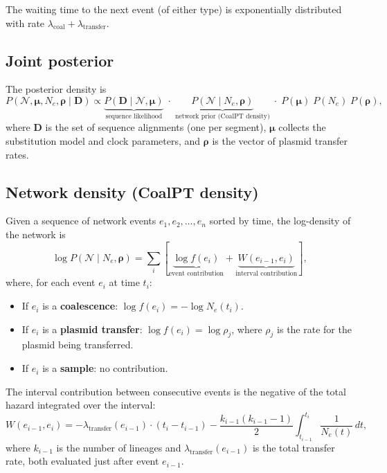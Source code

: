 \documentclass[11pt]{article}
\begin{document}
The waiting time to the next event (of either type) is exponentially distributed with rate $\lambda_{\text{coal}} + \lambda_{\text{transfer}}$.

\subsection{Joint posterior}

The posterior density is
\begin{equation}
  P(\mathcal{N}, \boldsymbol{\mu}, N_e, \boldsymbol{\rho} \mid \mathbf{D})
  \propto
  \underbrace{P(\mathbf{D} \mid \mathcal{N}, \boldsymbol{\mu})}_{\text{sequence likelihood}}
  \;\cdot\;
  \underbrace{P(\mathcal{N} \mid N_e, \boldsymbol{\rho})}_{\text{network prior (CoalPT density)}}
  \;\cdot\;
  P(\boldsymbol{\mu}) \; P(N_e) \; P(\boldsymbol{\rho}),
\end{equation}
where $\mathbf{D}$ is the set of sequence alignments (one per segment), $\boldsymbol{\mu}$ collects the substitution model and clock parameters, and $\boldsymbol{\rho}$ is the vector of plasmid transfer rates.

\subsection{Network density (CoalPT density)}

Given a sequence of network events $e_1, e_2, \ldots, e_n$ sorted by time, the log-density of the network is
\begin{equation}
  \log P(\mathcal{N} \mid N_e, \boldsymbol{\rho})
  = \sum_{i} \left[ \underbrace{\log f(e_i)}_{\text{event contribution}} + \underbrace{W(e_{i-1}, e_i)}_{\text{interval contribution}} \right],
\end{equation}
where, for each event $e_i$ at time $t_i$:

\begin{itemize}
  \item If $e_i$ is a \textbf{coalescence}:
    $\log f(e_i) = -\log N_e(t_i)$.

  \item If $e_i$ is a \textbf{plasmid transfer}:
    $\log f(e_i) = \log \rho_j$,
    where $\rho_j$ is the rate for the plasmid being transferred.

  \item If $e_i$ is a \textbf{sample}: no contribution.
\end{itemize}

\noindent The interval contribution between consecutive events is the negative of the total hazard integrated over the interval:
\begin{equation}
  W(e_{i-1}, e_i) = -\lambda_{\text{transfer}}(e_{i-1}) \cdot (t_i - t_{i-1})
                     - \frac{k_{i-1}(k_{i-1} - 1)}{2} \int_{t_{i-1}}^{t_i} \frac{1}{N_e(t)}\, dt,
\end{equation}
where $k_{i-1}$ is the number of lineages and $\lambda_{\text{transfer}}(e_{i-1})$ is the total transfer rate, both evaluated just after event $e_{i-1}$.
\end{document}
